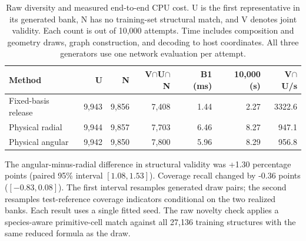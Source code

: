 \begin{table}[!htbp]\centering\small\setlength{\tabcolsep}{4pt}
\caption{Raw diversity and measured end-to-end CPU cost. U is the first representative in its generated bank, N has no training-set structural match, and V denotes joint validity. Each count is out of 10,000 attempts. Time includes composition and geometry draws, graph construction, and decoding to host coordinates. All three generators use one network evaluation per attempt.}\label{tab:new-cost}
\begin{tabular}{lrrrrrr}\hline Method & U & N & V$\cap$U$\cap$N & B1 (ms) & 10,000 (s) & V$\cap$U/s\\\hline
Fixed-basis release & 9,943 & 9,856 & 7,408 & 1.44 & 2.27 & 3322.6\\
Physical radial & 9,944 & 9,857 & 7,703 & 6.46 & 8.27 & 947.1\\
Physical angular & 9,942 & 9,850 & 7,800 & 5.96 & 8.29 & 956.8\\
\hline\end{tabular}\end{table}
The angular-minus-radial difference in structural validity was +1.30 percentage points (paired 95\% interval $[1.08,1.53]$). Coverage recall changed by -0.36 points ($[-0.83,0.08]$). The first interval resamples generated draw pairs; the second resamples test-reference coverage indicators conditional on the two realized banks. Each result uses a single fitted seed. The raw novelty check applies a species-aware primitive-cell match against all 27,136 training structures with the same reduced formula as the draw.
